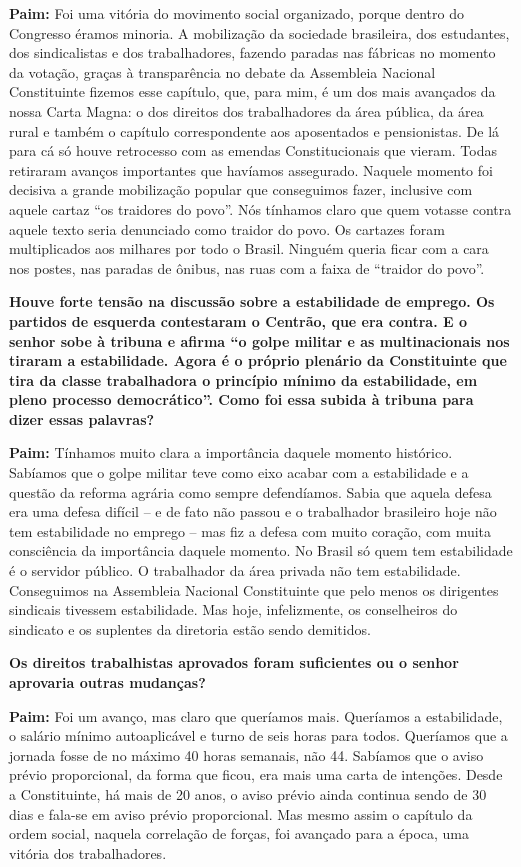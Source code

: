 \textbf{Paim:} Foi uma vitória do movimento social organizado, porque
dentro do Congresso éramos minoria. A mobilização da sociedade
brasileira, dos estudantes, dos sindicalistas e dos trabalhadores,
fazendo paradas nas fábricas no momento da votação, graças à
transparência no debate da Assembleia Nacional Constituinte fizemos esse
capítulo, que, para mim, é um dos mais avançados da nossa Carta Magna: o
dos direitos dos trabalhadores da área pública, da área rural e também o
capítulo correspondente aos aposentados e pensionistas. De lá para cá só
houve retrocesso com as emendas Constitucionais que vieram. Todas
retiraram avanços importantes que havíamos assegurado. Naquele momento
foi decisiva a grande mobilização popular que conseguimos fazer,
inclusive com aquele cartaz ``os traidores do povo''. Nós tínhamos claro
que quem votasse contra aquele texto seria denunciado como traidor do
povo. Os cartazes foram multiplicados aos milhares por todo o Brasil.
Ninguém queria ficar com a cara nos postes, nas paradas de ônibus, nas
ruas com a faixa de ``traidor do povo''.

\textbf{Houve forte tensão na discussão sobre a estabilidade de emprego.
Os partidos de esquerda contestaram o Centrão, que era contra. E o
senhor sobe à tribuna e afirma ``o golpe militar e as multinacionais nos
tiraram a estabilidade. Agora é o próprio plenário da Constituinte que
tira da classe trabalhadora o princípio mínimo da estabilidade, em pleno
processo democrático''. Como foi essa subida à tribuna para dizer essas
palavras?}

\textbf{Paim:} Tínhamos muito clara a importância daquele momento
histórico. Sabíamos que o golpe militar teve como eixo acabar com a
estabilidade e a questão da reforma agrária como sempre defendíamos.
Sabia que aquela defesa era uma defesa difícil -- e de fato não passou e
o trabalhador brasileiro hoje não tem estabilidade no emprego -- mas fiz
a defesa com muito coração, com muita consciência da importância daquele
momento. No Brasil só quem tem estabilidade é o servidor público. O
trabalhador da área privada não tem estabilidade. Conseguimos na
Assembleia Nacional Constituinte que pelo menos os dirigentes sindicais
tivessem estabilidade. Mas hoje, infelizmente, os conselheiros do
sindicato e os suplentes da diretoria estão sendo demitidos.

\textbf{Os direitos trabalhistas aprovados foram suficientes ou o senhor
aprovaria outras mudanças?}

\textbf{Paim:} Foi um avanço, mas claro que queríamos mais. Queríamos a
estabilidade, o salário mínimo autoaplicável e turno de seis horas para
todos. Queríamos que a jornada fosse de no máximo 40 horas semanais, não
44. Sabíamos que o aviso prévio proporcional, da forma que ficou, era
mais uma carta de intenções. Desde a Constituinte, há mais de 20 anos, o
aviso prévio ainda continua sendo de 30 dias e fala-se em aviso prévio
proporcional. Mas mesmo assim o capítulo da ordem social, naquela
correlação de forças, foi avançado para a época, uma vitória dos
trabalhadores.

